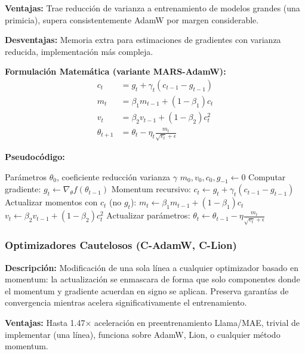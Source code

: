 \documentclass[11pt,a4paper]{article}
\begin{document}
\textbf{Ventajas:} Trae reducción de varianza a entrenamiento de modelos grandes (una primicia), supera consistentemente AdamW por margen considerable.

\textbf{Desventajas:} Memoria extra para estimaciones de gradientes con varianza reducida, implementación más compleja.

\textbf{Formulación Matemática (variante MARS-AdamW):}
\begin{align}
c_t &= g_t + \gamma_t (c_{t-1} - g_{t-1}) \\
m_t &= \beta_1 m_{t-1} + (1 - \beta_1) c_t \\
v_t &= \beta_2 v_{t-1} + (1 - \beta_2) c_t^2 \\
\theta_{t+1} &= \theta_t - \eta_t \frac{m_t}{\sqrt{v_t} + \epsilon}
\end{align}

\textbf{Pseudocódigo:}
\begin{algorithm}
\caption{MARS — Marco de Reducción de Varianza}
\begin{algorithmic}[1]
\Require Parámetros $\theta_0$, coeficiente reducción varianza $\gamma$
\State $m_0, v_0, c_0, g_{-1} \gets 0$
\State Computar gradiente: $g_t \gets \nabla_\theta f(\theta_{t-1})$
\State Momentum recursivo: $c_t \gets g_t + \gamma_t(c_{t-1} - g_{t-1})$
\State Actualizar momentos con $c_t$ (no $g_t$):
\State \quad $m_t \gets \beta_1 m_{t-1} + (1-\beta_1) c_t$
\State \quad $v_t \gets \beta_2 v_{t-1} + (1-\beta_2) c_t^2$
\State Actualizar parámetros: $\theta_t \gets \theta_{t-1} - \eta \frac{m_t}{\sqrt{v_t}+\epsilon}$
\EndFor
\end{algorithmic}
\end{algorithm}

\subsubsection{Optimizadores Cautelosos (C-AdamW, C-Lion)}

\textbf{Descripción:} Modificación de una sola línea a cualquier optimizador basado en momentum: la actualización se enmascara de forma que solo componentes donde el momentum y gradiente acuerdan en signo se aplican. Preserva garantías de convergencia mientras acelera significativamente el entrenamiento.

\textbf{Ventajas:} Hasta 1.47× aceleración en preentrenamiento Llama/MAE, trivial de implementar (una línea), funciona sobre AdamW, Lion, o cualquier método momentum.
\end{document}
